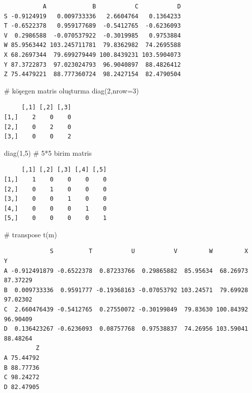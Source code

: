 \documentclass[
  letterpaper,
  DIV=11,
  numbers=noendperiod]{scrreprt}
\newenvironment{Shaded}{\begin{snugshade}}{\end{snugshade}}
\newcommand{\AttributeTok}[1]{\textcolor[rgb]{0.40,0.45,0.13}{#1}}
\newcommand{\CommentTok}[1]{\textcolor[rgb]{0.37,0.37,0.37}{#1}}
\newcommand{\DecValTok}[1]{\textcolor[rgb]{0.68,0.00,0.00}{#1}}
\newcommand{\FunctionTok}[1]{\textcolor[rgb]{0.28,0.35,0.67}{#1}}
\newcommand{\NormalTok}[1]{\textcolor[rgb]{0.00,0.23,0.31}{#1}}
\begin{document}
\begin{verbatim}
           A             B           C           D
S -0.9124919   0.009733336   2.6604764   0.1364233
T -0.6522378   0.959177689  -0.5412765  -0.6236093
V  0.2986588  -0.070537922  -0.3019985   0.9753884
W 85.9563442 103.245711781  79.8362982  74.2695588
X 68.2697344  79.699279449 100.8439231 103.5904073
Y 87.3722873  97.023024793  96.9040897  88.4826412
Z 75.4479221  88.777360724  98.2427154  82.4790504
\end{verbatim}

\begin{Shaded}
\begin{Highlighting}[]
\CommentTok{\# köşegen matris oluşturma}
\FunctionTok{diag}\NormalTok{(}\DecValTok{2}\NormalTok{,}\AttributeTok{nrow=}\DecValTok{3}\NormalTok{)}
\end{Highlighting}
\end{Shaded}

\begin{verbatim}
     [,1] [,2] [,3]
[1,]    2    0    0
[2,]    0    2    0
[3,]    0    0    2
\end{verbatim}

\begin{Shaded}
\begin{Highlighting}[]
\FunctionTok{diag}\NormalTok{(}\DecValTok{1}\NormalTok{,}\DecValTok{5}\NormalTok{) }\CommentTok{\# 5*5 birim matris}
\end{Highlighting}
\end{Shaded}

\begin{verbatim}
     [,1] [,2] [,3] [,4] [,5]
[1,]    1    0    0    0    0
[2,]    0    1    0    0    0
[3,]    0    0    1    0    0
[4,]    0    0    0    1    0
[5,]    0    0    0    0    1
\end{verbatim}

\begin{Shaded}
\begin{Highlighting}[]
\CommentTok{\# transpose}
\FunctionTok{t}\NormalTok{(m)}
\end{Highlighting}
\end{Shaded}

\begin{verbatim}
             S          T           U           V         W         X        Y
A -0.912491879 -0.6522378  0.87233766  0.29865882  85.95634  68.26973 87.37229
B  0.009733336  0.9591777 -0.19368163 -0.07053792 103.24571  79.69928 97.02302
C  2.660476439 -0.5412765  0.27550072 -0.30199849  79.83630 100.84392 96.90409
D  0.136423267 -0.6236093  0.08757768  0.97538837  74.26956 103.59041 88.48264
         Z
A 75.44792
B 88.77736
C 98.24272
D 82.47905
\end{verbatim}
\end{document}
